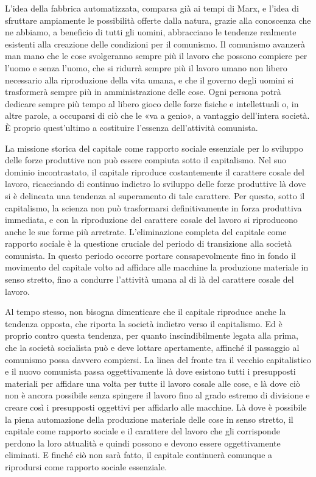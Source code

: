 \documentclass[../main]{subfiles}
\begin{document}
L'idea della fabbrica automatizzata, comparsa già ai tempi di Marx, e l'idea di sfruttare ampiamente le possibilità offerte dalla natura, grazie alla conoscenza che ne abbiamo, a beneficio di tutti gli uomini, abbracciano le tendenze realmente esistenti alla creazione delle condizioni per il comunismo. Il comunismo avanzerà man mano che le cose svolgeranno sempre più il lavoro che possono compiere per l'uomo e senza l'uomo, che si ridurrà sempre più il lavoro umano non libero necessario alla riproduzione della vita umana, e che il governo degli uomini si trasformerà sempre più in amministrazione delle cose. Ogni persona potrà dedicare sempre più tempo al libero gioco delle forze fisiche e intellettuali o, in altre parole, a occuparsi di ciò che le «va a genio», a vantaggio dell'intera società. È proprio quest'ultimo a costituire l'essenza dell'attività comunista.

La missione storica del capitale come rapporto sociale essenziale per lo sviluppo delle forze produttive non può essere compiuta sotto il capitalismo. Nel suo dominio incontrastato, il capitale riproduce costantemente il carattere cosale del lavoro, ricacciando di continuo indietro lo sviluppo delle forze produttive là dove si è delineata una tendenza al superamento di tale carattere. Per questo, sotto il capitalismo, la scienza non può trasformarsi definitivamente in forza produttiva immediata, e con la riproduzione del carattere cosale del lavoro si riproducono anche le sue forme più arretrate. L'eliminazione completa del capitale come rapporto sociale è la questione cruciale del periodo di transizione alla società comunista. In questo periodo occorre portare consapevolmente fino in fondo il movimento del capitale volto ad affidare alle macchine la produzione materiale in senso stretto, fino a condurre l'attività umana al di là del carattere cosale del lavoro.

Al tempo stesso, non bisogna dimenticare che il capitale riproduce anche la tendenza opposta, che riporta la società indietro verso il capitalismo. Ed è proprio contro questa tendenza, per quanto inscindibilmente legata alla prima, che la società socialista può e deve lottare apertamente, affinché il passaggio al comunismo possa davvero compiersi. La linea del fronte tra il vecchio capitalistico e il nuovo comunista passa oggettivamente là dove esistono tutti i presupposti materiali per affidare una volta per tutte il lavoro cosale alle cose, e là dove ciò non è ancora possibile senza spingere il lavoro fino al grado estremo di divisione e creare così i presupposti oggettivi per affidarlo alle macchine. Là dove è possibile la piena automazione della produzione materiale delle cose in senso stretto, il capitale come rapporto sociale e il carattere del lavoro che gli corrisponde perdono la loro attualità e quindi possono e devono essere oggettivamente eliminati. E finché ciò non sarà fatto, il capitale continuerà comunque a riprodursi come rapporto sociale essenziale.
\end{document}

